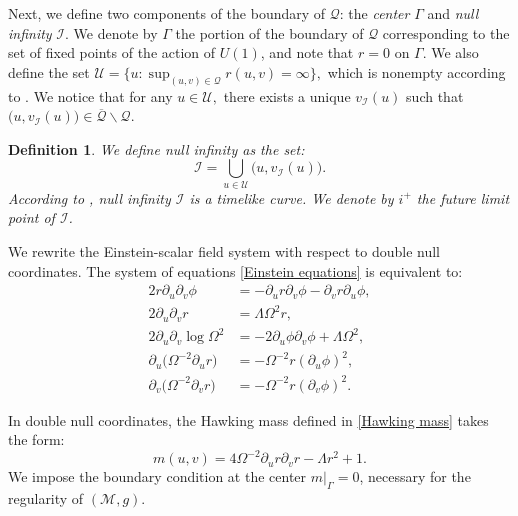 \documentclass[11pt]{article}
\newtheorem{definition}{Definition}[section]
\numberwithin{equation}{section}
\begin{document}
Next, we define two components of the boundary of $\mathcal{Q}$: the \textit{center} $\Gamma$ and \textit{null infinity} $\mathcal{I}.$ We denote by $\Gamma$ the portion of the boundary of $\mathcal{Q}$ corresponding to the set of fixed points of the action of $U(1)$, and note that $r=0$ on $\Gamma$. We also define the set $\mathcal{U}=\big\{u: \sup_{(u,v)\in\mathcal{Q}}r(u,v)=\infty\big\},$ which is nonempty according to . We notice that for any $u\in\mathcal{U},$ there exists a unique $v_{\mathcal{I}}(u)$ such that $\big(u,v_{\mathcal{I}}(u)\big)\in\overline{\mathcal{Q}}\backslash\mathcal{Q}.$
\begin{definition}
    We define null infinity as the set:
    \[\mathcal{I}=\bigcup_{u\in\mathcal{U}}\big(u,v_{\mathcal{I}}(u)\big).\]
    According to , null infinity $\mathcal{I}$ is a timelike curve. We denote by $i^+$ the future limit point of $\mathcal{I}$.
\end{definition}

We rewrite the Einstein-scalar field system with respect to double null coordinates. The system of equations \eqref{Einstein equations} is equivalent to:
\begin{align}
    2r\partial_u\partial_v\phi&=-\partial_ur\partial_v\phi-\partial_vr\partial_u\phi,\label{wave equation phi}\\
    2\partial_u\partial_vr&=\Lambda\Omega^2r,\label{wave equation r}\\
    2\partial_u\partial_v\log\Omega^{2}&=-2\partial_u\phi\partial_v\phi+\Lambda\Omega^2,\label{wave equation Omega}\\
    \partial_u\big(\Omega^{-2}\partial_ur\big)&=-\Omega^{-2}r(\partial_u\phi)^2,\label{Ray u}\\
    \partial_v\big(\Omega^{-2}\partial_vr\big)&=-\Omega^{-2}r(\partial_v\phi)^2\label{Ray v}.
\end{align}

In double null coordinates, the Hawking mass defined in \eqref{Hawking mass} takes the form:
\begin{equation}\label{Hawking mass double null}
    m(u,v)=4\Omega^{-2}\partial_ur\partial_vr-\Lambda r^2+1.
\end{equation}
We impose the boundary condition at the center $m|_{\Gamma}=0$, necessary for the regularity of $(\mathcal{M},g)$.
\end{document}
